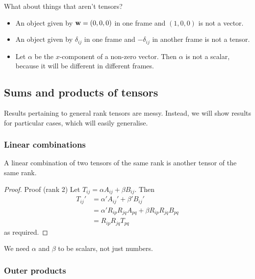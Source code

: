 \documentclass{../template/note}
\begin{document}
    What about things that aren't tensors?

    \begin{itemize}
        \item An object given by \(\V w = (0, 0, 0)\) in one frame and \((1, 0, 0)\) is not a vector.
        \item An object given by \(\delta_{ij}\) in one frame and \(-\delta_{ij}\) in another frame is not a tensor.
        \item Let \(\alpha\) be the \(x\)-component of a non-zero vector. Then \(\alpha\) is not a scalar, because it will be different in different frames.
    \end{itemize}
    
    \subsection{Sums and products of tensors}

    Results pertaining to general rank tensors are messy. Instead, we will show results for particular cases, which will easily generalise.

    \subsubsection{Linear combinations}

    \begin{proposition*}
        A linear combination of two tensors of the same rank is another tensor of the same rank.
    \end{proposition*}
    
    \begin{proof}{Proof (rank 2)}
        Let \(T_{ij} = \alpha A_{ij} + \beta B_{ij}\). Then
        \begin{align*}
            T_{ij}' &= \alpha' A_{ij}' + \beta' B_{ij}' \\
            &= \alpha' R_{ip} R_{jq} A_{pq} + \beta R_{ip} R_{jq} B_{pq} \\
            &= R_{ip} R_{jq} T_{pq}
        \end{align*}
        as required.        
    \end{proof}
    
    \begin{remark*}
        We need \(\alpha\) and \(\beta\) to be scalars, not just numbers.
    \end{remark*}
    
    \subsubsection{Outer products}
\end{document}
